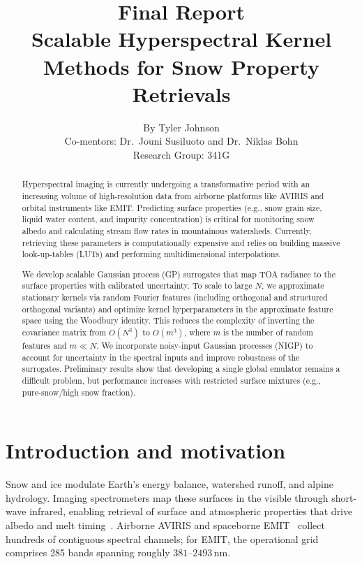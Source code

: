 \documentclass[11pt]{article}
\title{Final Report\\[0.4em]
\large Scalable Hyperspectral Kernel Methods for Snow Property Retrievals}
\author{
By Tyler Johnson\\
Co-mentors: Dr.\ Jouni Susiluoto and Dr.\ Niklas Bohn\\
Research Group: 341G
}
\date{}
\begin{document}
\maketitle

\begin{abstract}
Hyperspectral imaging is currently undergoing a transformative period with an increasing
volume of high-resolution data from airborne platforms like AVIRIS and orbital instruments
like EMIT.
Predicting surface properties (e.g., snow grain size, liquid water content, and impurity
concentration) is critical for monitoring snow albedo and calculating stream flow rates in
mountainous watersheds.
Currently, retrieving these parameters is computationally expensive and relies on building
massive look-up-tables (LUTs) and performing multidimensional interpolations.

We develop scalable Gaussian process (GP) surrogates that map TOA radiance to the surface
properties with calibrated uncertainty.
To scale to large $N$, we approximate stationary kernels via random Fourier features
(including orthogonal and structured orthogonal variants) and optimize kernel
hyperparameters in the approximate feature space using the Woodbury identity.
This reduces the complexity of inverting the covariance matrix from $O(N^{3})$ to
$O(m^{3})$, where $m$ is the number of random features and $m\ll N$.
We incorporate noisy-input Gaussian processes (NIGP) to account for uncertainty in the
spectral inputs and improve robustness of the surrogates.
Preliminary results show that developing a single global emulator remains a difficult
problem, but performance increases with restricted surface mixtures (e.g., pure-snow/high
snow fraction).
\end{abstract}

\tableofcontents
\newpage

\section{Introduction and motivation}
\label{sec:intro}

Snow and ice modulate Earth's energy balance, watershed runoff, and alpine hydrology.
Imaging spectrometers map these surfaces in the visible through short-wave infrared,
enabling retrieval of surface and atmospheric properties that drive albedo and melt
timing~\cite{Bohn03172025,Bohn25,COLEMAN2024114450}.
Airborne AVIRIS and spaceborne EMIT~\cite{thompson2020emit} collect hundreds of contiguous
spectral channels; for EMIT, the operational grid comprises 285 bands spanning roughly
$381$--$2493\,\mathrm{nm}$.
\end{document}
